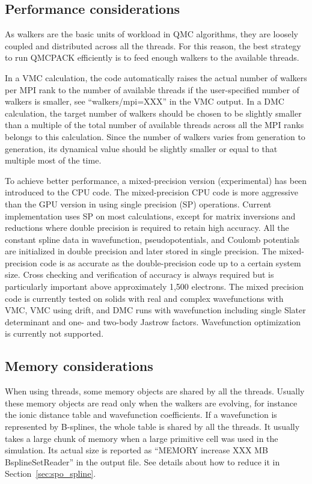 \subsection{Performance considerations}
\label{sec:cpu:performance}
As walkers are the basic units of workload in QMC algorithms, they are loosely coupled and distributed across all the threads. For this reason, the best strategy to run QMCPACK efficiently is to feed enough walkers to the available threads.

In a VMC calculation, the code automatically raises the actual number of walkers per MPI rank to the number of available threads if the user-specified number of walkers is smaller, see ``walkers/mpi=XXX'' in the VMC output.  In a DMC calculation, the target number of walkers should be chosen to be slightly smaller than a multiple of the total number of available threads across all the MPI ranks belongs to this calculation. Since the number of walkers varies from generation to generation, its dynamical value should be slightly smaller or equal to that multiple most of the time.

To achieve better performance, a mixed-precision version (experimental) has been introduced to the CPU code. The mixed-precision CPU code is more aggressive than the GPU version in using single precision (SP) operations. Current implementation uses SP on most calculations, except for matrix inversions and reductions where double precision is required to retain high accuracy. All the constant spline data in wavefunction, pseudopotentials, and Coulomb potentials are initialized in double precision and later stored in single precision. The mixed-precision code is as accurate as the double-precision code up to a certain system size. Cross checking and verification of accuracy is always required but is particularly important above approximately 1,500 electrons. The mixed precision code is currently tested on solids with real and complex wavefunctions with VMC, VMC using drift, and DMC runs with wavefunction including single Slater determinant and one- and two-body Jastrow factors. Wavefunction optimization is currently not supported.

\subsection{Memory considerations}
When using threads, some memory objects are shared by all the threads. Usually these memory objects are read only when the walkers are evolving, for instance the ionic distance table and wavefunction coefficients.
If a wavefunction is represented by B-splines, the whole table is shared by all the threads. It usually takes a large chunk of memory when a large primitive cell was used in the simulation. Its actual size is reported as ``MEMORY increase XXX MB BsplineSetReader'' in the output file.
See details about how to reduce it in Section~\ref{sec:spo_spline}.

